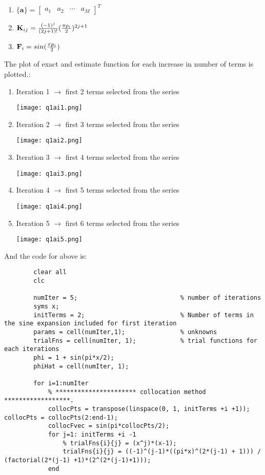 \documentclass[11pt,paper=a4,answers]{exam}
\begin{document}
\begin{questions}
\begin{enumerate}[]
\begin{enumerate}[]
        \item $\{\mathbf{a}\} = \begin{bmatrix}
            a_1 & a_2 & \cdots & a_M
        \end{bmatrix}^T$
        \item $\mathbf{K}_{ij} = \frac{(-1)^j}{(2j+1)!}({\pi p_i \over 2})^{2j+1}$
        \item $\mathbf{F}_i = sin({\pi p_i \over 2})$
    \end{enumerate}
    The plot of exact and estimate function for each increase in number of terms is plotted.:
    \begin{enumerate}
        \item Iteration 1 $\longrightarrow$ first 2 terms selected from the series\\
        \centerline{\texttt{[image: q1ai1.png]}}
        \item Iteration 2 $\longrightarrow$ first 3 terms selected from the series\\
        \centerline{\texttt{[image: q1ai2.png]}}
        \item Iteration 3 $\longrightarrow$ first 4 terms selected from the series\\
        \centerline{\texttt{[image: q1ai3.png]}}
        \item Iteration 4 $\longrightarrow$ first 5 terms selected from the series\\
        \centerline{\texttt{[image: q1ai4.png]}}
        \newpage
        \item Iteration 5 $\longrightarrow$ first 6 terms selected from the series\\
        \centerline{\texttt{[image: q1ai5.png]}}
    \end{enumerate}
    And the code for above is:\\
    \begin{lstlisting}
        clear all
        clc

        numIter = 5;                            % number of iterations
        syms x;
        initTerms = 2;                          % Number of terms in the sine expansion included for first iteration
        params = cell(numIter,1);               % unknowns
        trialFns = cell(numIter, 1);            % trial functions for each iterations
        phi = 1 + sin(pi*x/2);
        phiHat = cell(numIter, 1);

        for i=1:numIter
            % ********************** collocation method ******************.
            collocPts = transpose(linspace(0, 1, initTerms +i +1)); collocPts = collocPts(2:end-1);
            collocFvec = sin(pi*collocPts/2);
            for j=1: initTerms +i -1
                % trialFns{i}{j} = (x^j)*(x-1);
                trialFns{i}{j} = ((-1)^(j-1)*((pi*x)^(2*(j-1) + 1))) / (factorial(2*(j-1) +1)*(2^(2*(j-1)+1)));
            end


\end{lstlisting}
\end{enumerate}
\end{questions}
\end{document}
